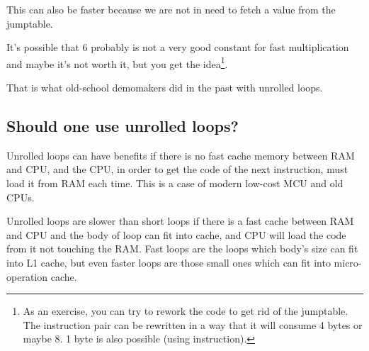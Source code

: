 This can also be faster because we are not in need to fetch a value from the jumptable.

It's possible that 6 probably is not a very good constant for fast multiplication and maybe it's not worth it,
but you get the idea\footnote{As an exercise, you can try to rework the code to get rid of 
the jumptable. 
The instruction pair can be rewritten in a way that it will consume 4 bytes or maybe 8. 
1 byte is also possible (using  instruction).}.

That is what old-school demomakers did in the past with unrolled loops.

\subsection{Should one use unrolled loops?}

Unrolled loops can have benefits if there is no fast cache memory between \ac{RAM} and \ac{CPU}, and the \ac{CPU},
in order to get the code of the next instruction, must load it from \ac{RAM} each time.
This is a case of modern low-cost \ac{MCU} and old \ac{CPU}s.

Unrolled loops are slower than short loops if there is a fast cache between \ac{RAM} and \ac{CPU} and the body of loop
can fit into cache, and \ac{CPU} will load the code from it not touching the \ac{RAM}.
Fast loops are the loops which body's size can fit into L1 cache, but even faster loops are those small ones
which can fit into micro-operation cache.

